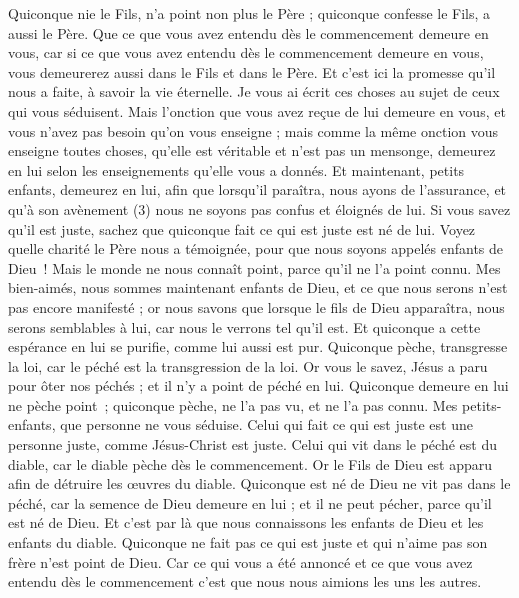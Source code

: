 \begin{multicols}{2}
Quiconque nie le Fils, n'a point non plus le Père ; quiconque confesse le Fils, a aussi le Père.
Que ce que vous avez entendu dès le commencement demeure en vous, car si ce que vous avez entendu dès le commencement demeure en vous, vous demeurerez aussi dans le Fils et dans le Père.
Et c'est ici la promesse qu'il nous a faite, à savoir la vie éternelle.
Je vous ai écrit ces choses au sujet de ceux qui vous séduisent.
Mais l'onction que vous avez reçue de lui demeure en vous, et vous n'avez pas besoin qu'on vous enseigne ; mais comme la même onction vous enseigne toutes choses, qu'elle est véritable et n'est pas un mensonge, demeurez en lui selon les enseignements qu’elle vous a donnés.
Et maintenant, petits enfants, demeurez en lui, afin que lorsqu’il paraîtra, nous ayons de l’assurance, et qu’à son avènement (3) nous ne soyons pas confus et éloignés de lui.
Si vous savez qu'il est juste, sachez que quiconque fait ce qui est juste est né de lui.
\TextTitle{[De l'adoption]}
\VerseOne{}Voyez quelle charité le Père nous a témoignée, pour que nous soyons appelés enfants de Dieu ! Mais le monde ne nous connaît point, parce qu'il ne l'a point connu.
Mes bien-aimés, nous sommes maintenant enfants de Dieu, et ce que nous serons n'est pas encore manifesté ; or nous savons que lorsque le fils de Dieu apparaîtra, nous serons semblables à lui, car nous le verrons tel qu'il est.
Et quiconque a cette espérance en lui se purifie, comme lui aussi est pur.
Quiconque pèche, transgresse la loi, car le péché est la transgression de la loi.
Or vous le savez, Jésus a paru pour ôter nos péchés ; et il n'y a point de péché en lui.
Quiconque demeure en lui ne pèche point ; quiconque pèche, ne l'a pas vu, et ne l'a pas connu.
Mes petits-enfants, que personne ne vous séduise. Celui qui fait ce qui est juste est une personne juste, comme Jésus-Christ est juste.
Celui qui vit dans le péché est du diable, car le diable pèche dès le commencement. Or le Fils de Dieu est apparu afin de détruire les œuvres du diable.
Quiconque est né de Dieu ne vit pas dans le péché, car la semence de Dieu demeure en lui ; et il ne peut pécher, parce qu'il est né de Dieu.
Et c'est par là que nous connaissons les enfants de Dieu et les enfants du diable. Quiconque ne fait pas ce qui est juste et qui n'aime pas son frère n'est point de Dieu.
Car ce qui vous a été annoncé et ce que vous avez entendu dès le commencement c’est que nous nous aimions les uns les autres.

\end{multicols}
